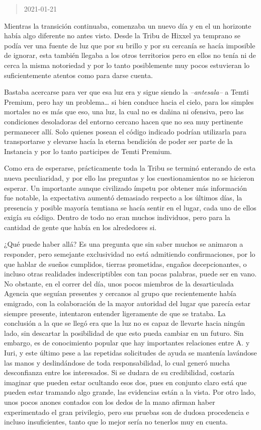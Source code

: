 \documentclass[
  spanish,
]{book}
\begin{document}
\begin{quote}
2021-01-21
\end{quote}

Mientras la transición continuaba, comenzaba un nuevo día y en el un horizonte había algo diferente no antes visto. Desde la Tribu de Hixxel ya temprano se podía ver una fuente de luz que por su brillo y por su cercanía se hacía imposible de ignorar, esta también llegaba a los otros territorios pero en ellos no tenía ni de cerca la misma notoriedad y por lo tanto posiblemente muy pocos estuvieran lo suficientemente atentos como para darse cuenta.

Bastaba acercarse para ver que esa luz era y sigue siendo la \emph{--antesala--} a Temti Premium, pero hay un problema\ldots{} si bien conduce hacia el cielo, para los simples mortales no es más que eso, una luz, la cual no es dañina ni ofensiva, pero las condiciones desoladoras del entorno cercano hacen que no sea muy pertinente permanecer allí. Solo quienes posean el código indicado podrían utilizarla para transportarse y elevarse hacía la eterna bendición de poder ser parte de la Instancia y por lo tanto participes de Temti Premium.

Como era de esperarse, prácticamente toda la Tribu se terminó enterando de esta nueva peculiaridad, y por ello las preguntas y los cuestionamientos no se hicieron esperar. Un importante aunque civilizado ímpetu por obtener más información fue notable, la expectativa aumentó demasiado respecto a los últimos días, la presencia y posible mayoría temtiana se hacía sentir en el lugar, cada uno de ellos exigía su código. Dentro de todo no eran muchos individuos, pero para la cantidad de gente que había en los alrededores si.

¿Qué puede haber allá?
Es una pregunta que sin saber muchos se animaron a responder, pero semejante exclusividad no está admitiendo confirmaciones, por lo que hablar de sueños cumplidos, tierras prometidas, engaños decepcionantes, o incluso otras realidades indescriptibles con tan pocas palabras, puede ser en vano. No obstante, en el correr del día, unos pocos miembros de la desarticulada Agencia que seguían presentes y cercanos al grupo que recientemente había emigrado, con la colaboración de la mayor autoridad del lugar que parecía estar siempre presente, intentaron entender ligeramente de que se trataba. La conclusión a la que se llegó era que la luz no es capaz de llevarte hacia ningún lado, sin descartar la posibilidad de que esto pueda cambiar en un futuro. Sin embargo, es de conocimiento popular que hay importantes relaciones entre A. y Iuri, y este último pese a las repetidas solicitudes de ayuda se mantenía lavándose las manos y deslindándose de toda responsabilidad, lo cual generó mucha desconfianza entre los interesados. Si se dudara de su credibilidad, costaría imaginar que pueden estar ocultando esos dos, pues en conjunto claro está que pueden estar tramando algo grande, las evidencias están a la vista.
Por otro lado, unos pocos anones contados con los dedos de la mano afirman haber experimentado el gran privilegio, pero sus pruebas son de dudosa procedencia e incluso insuficientes, tanto que lo mejor sería no tenerlos muy en cuenta.
\end{document}
